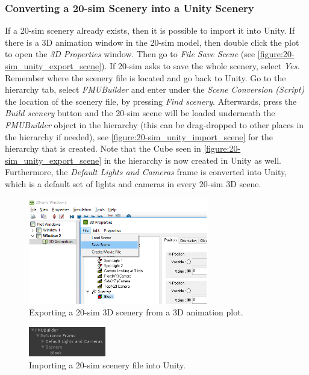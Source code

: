 \subsubsection{Converting a 20-sim Scenery into a Unity Scenery}
If a 20-sim scenery already exists, then it is possible to import it into Unity. If there is a 3D animation window in the 20-sim model, then double click the plot to open the \textit{3D Properties} window. Then go to \textit{File \textrightarrow Save Scene} (see \autoref{figure:20-sim_unity_export_scene}). If 20-sim asks to save the whole scenery, select \textit{Yes}. Remember where the scenery file is located and go back to Unity. Go to the hierarchy tab, select \textit{FMUBuilder} and enter under the \textit{Scene Conversion (Script)} the location of the scenery file, by pressing \textit{Find scenery}. Afterwards, press the \textit{Build scenery} button and the 20-sim scene will be loaded underneath the \textit{FMUBuilder} object in the hierarchy (this can be drag-dropped to other places in the hierarchy if needed), see \autoref{figure:20-sim_unity_import_scene} for the hierarchy that is created. Note that the Cube seen in \autoref{figure:20-sim_unity_export_scene} in the hierarchy is now created in Unity as well. Furthermore, the \textit{Default Lights and Cameras} frame is converted into Unity, which is a default set of lights and cameras in every 20-sim 3D scene. 
%
\begin{figure}[ht]
	\centerline{\includegraphics[width=0.7\textwidth]{figures/20sim_Unity7.png}}
	\caption{Exporting a 20-sim 3D scenery from a 3D animation plot.}
	\label{figure:20-sim_unity_export_scene}
\end{figure}
%
\begin{figure}[ht]
	\centerline{\includegraphics[width=0.3\textwidth]{figures/20sim_Unity8.png}}
	\caption{Importing a 20-sim scenery file into Unity.}
	\label{figure:20-sim_unity_import_scene}
\end{figure}
%
